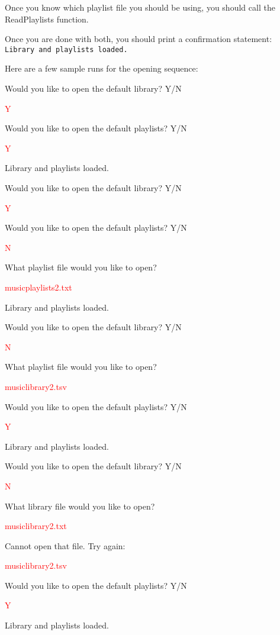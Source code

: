 Once you know which playlist file you should be using, you should call the ReadPlaylists function. 

Once you are done with both, you should print a confirmation statement: \texttt{Library and playlists loaded.}


Here are a few sample runs for the opening sequence:

\begin{sample}
Would you like to open the default library? Y/N

\textcolor{red}{Y}

Would you like to open the default playlists? Y/N

\textcolor{red}{Y}

Library and playlists loaded.

\end{sample}

\begin{sample}
Would you like to open the default library? Y/N

\textcolor{red}{Y}

Would you like to open the default playlists? Y/N

\textcolor{red}{N}

What playlist file would you like to open?

\textcolor{red}{musicplaylists2.txt}

Library and playlists loaded.
\end{sample}

\begin{sample}
Would you like to open the default library? Y/N

\textcolor{red}{N}

What playlist file would you like to open?

\textcolor{red}{musiclibrary2.tsv}

Would you like to open the default playlists? Y/N

\textcolor{red}{Y}

Library and playlists loaded.
\end{sample}

\begin{sample}
Would you like to open the default library? Y/N

\textcolor{red}{N}

What library file would you like to open?

\textcolor{red}{musiclibrary2.txt}

Cannot open that file. Try again:

\textcolor{red}{musiclibrary2.tsv}

Would you like to open the default playlists? Y/N

\textcolor{red}{Y}

Library and playlists loaded.
\end{sample}

